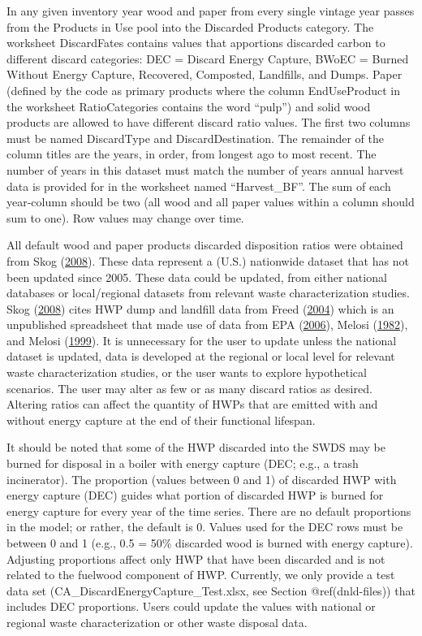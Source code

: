 \documentclass[
  openany]{book}
\begin{document}
In any given inventory year wood and paper from every single vintage
year passes from the Products in Use pool into the Discarded Products
category. The worksheet DiscardFates contains values that apportions
discarded carbon to different discard categories: DEC = Discard Energy
Capture, BWoEC = Burned Without Energy Capture, Recovered, Composted,
Landfills, and Dumps. Paper (defined by the code as primary products
where the column EndUseProduct in the worksheet RatioCategories contains
the word ``pulp'') and solid wood products are allowed to have different
discard ratio values. The first two columns must be named DiscardType
and DiscardDestination. The remainder of the column titles are the
years, in order, from longest ago to most recent. The number of years in
this dataset must match the number of years annual harvest data is
provided for in the worksheet named ``Harvest\_BF''. The sum of each
year-column should be two (all wood and all paper values within a column
should sum to one). Row values may change over time.

All default wood and paper products discarded disposition ratios were
obtained from Skog (\protect\hyperlink{ref-skog2008}{2008}). These data
represent a (U.S.) nationwide dataset that has not been updated since
2005. These data could be updated, from either national databases or
local/regional datasets from relevant waste characterization studies.
Skog (\protect\hyperlink{ref-skog2008}{2008}) cites HWP dump and
landfill data from Freed (\protect\hyperlink{ref-freed2004}{2004}) which
is an unpublished spreadsheet that made use of data from EPA
(\protect\hyperlink{ref-epa2006}{2006}), Melosi
(\protect\hyperlink{ref-melosi1982}{1982}), and Melosi
(\protect\hyperlink{ref-melosi1999}{1999}). It is unnecessary for the
user to update unless the national dataset is updated, data is developed
at the regional or local level for relevant waste characterization
studies, or the user wants to explore hypothetical scenarios. The user
may alter as few or as many discard ratios as desired. Altering ratios
can affect the quantity of HWPs that are emitted with and without energy
capture at the end of their functional lifespan.

It should be noted that some of the HWP discarded into the SWDS may be
burned for disposal in a boiler with energy capture (DEC; e.g., a trash
incinerator). The proportion (values between 0 and 1) of discarded HWP
with energy capture (DEC) guides what portion of discarded HWP is burned
for energy capture for every year of the time series. There are no
default proportions in the model; or rather, the default is 0. Values
used for the DEC rows must be between 0 and 1 (e.g., 0.5 = 50\%
discarded wood is burned with energy capture). Adjusting proportions
affect only HWP that have been discarded and is not related to the
fuelwood component of HWP. Currently, we only provide a test data set
(CA\_DiscardEnergyCapture\_Test.xlsx, see Section @ref(dnld-files)) that
includes DEC proportions. Users could update the values with national or
regional waste characterization or other waste disposal data.
\end{document}
